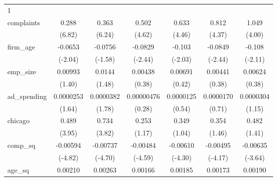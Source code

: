 {\begin{tabular}{l*{6}{c}}
\hline
1           &                     &                     &                     &                     &                     &                     \\
complaints  &       0.288\sym{***}&       0.363\sym{***}&       0.502\sym{***}&       0.633\sym{***}&       0.812\sym{***}&       1.049\sym{***}\\
            &      (6.82)         &      (6.24)         &      (4.62)         &      (4.46)         &      (4.37)         &      (4.00)         \\
[1em]
firm\_age    &     -0.0653\sym{*}  &     -0.0756         &     -0.0829\sym{*}  &      -0.103\sym{*}  &     -0.0849\sym{*}  &      -0.108\sym{*}  \\
            &     (-2.04)         &     (-1.58)         &     (-2.44)         &     (-2.03)         &     (-2.44)         &     (-2.11)         \\
[1em]
emp\_size    &     0.00993         &      0.0144         &     0.00438         &     0.00691         &     0.00441         &     0.00624         \\
            &      (1.40)         &      (1.48)         &      (0.38)         &      (0.42)         &      (0.38)         &      (0.38)         \\
[1em]
ad\_spending &   0.0000253         &   0.0000382         &  0.00000476         &   0.0000125         &   0.0000170         &   0.0000304         \\
            &      (1.64)         &      (1.78)         &      (0.28)         &      (0.54)         &      (0.71)         &      (1.15)         \\
[1em]
chicago     &       0.489\sym{***}&       0.734\sym{***}&       0.253         &       0.349         &       0.354         &       0.482         \\
            &      (3.95)         &      (3.82)         &      (1.17)         &      (1.04)         &      (1.46)         &      (1.41)         \\
[1em]
comp\_sq     &    -0.00594\sym{***}&    -0.00737\sym{***}&    -0.00484\sym{***}&    -0.00610\sym{***}&    -0.00495\sym{***}&    -0.00635\sym{***}\\
            &     (-4.82)         &     (-4.70)         &     (-4.59)         &     (-4.30)         &     (-4.17)         &     (-3.64)         \\
[1em]
age\_sq      &     0.00210         &     0.00263         &     0.00166         &     0.00185         &     0.00173         &     0.00190         \\

\end{tabular}}
